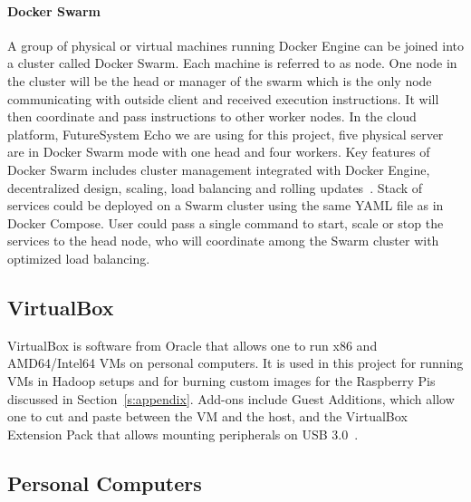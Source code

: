 \paragraph{Docker Swarm} A group of physical or virtual machines running 
Docker Engine can be joined into a cluster called Docker Swarm. Each 
machine is referred to as node. One node in the cluster will be the head or 
manager of the swarm which is the only node communicating with outside 
client and received execution instructions. It will then coordinate and pass 
instructions to other worker nodes. In the cloud platform, FutureSystem 
Echo we are using for this project, five physical server are in Docker Swarm 
mode with one head and four workers. Key features of Docker Swarm 
includes cluster management integrated with Docker Engine, decentralized 
design, scaling, load balancing and rolling 
updates~\cite{hid-sp18-405-docker-swarm-doc}. Stack of services could be 
deployed on a Swarm cluster using the same YAML file as in Docker 
Compose. User could pass a single command to start, scale or stop the 
services to the head node, who will coordinate among the Swarm cluster with 
optimized load balancing. 

\subsection{VirtualBox}
VirtualBox is software from Oracle that allows one to run x86 and
AMD64/Intel64 VMs on personal computers. It is used in this project
for running VMs in Hadoop setups and for burning custom images for the
Raspberry Pis discussed in Section~\ref{s:appendix}. Add-ons include
Guest Additions, which allow one to cut and paste between the VM and
the host, and the VirtualBox Extension Pack that allows mounting
peripherals on USB 3.0~\cite{hid-sp18-419-virtualbox}.

\subsection{Personal Computers}\label{ss:pcs}

